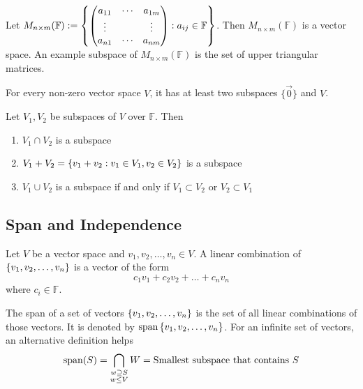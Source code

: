\documentclass[../notes.tex]{subfiles}
\begin{document}
\begin{example}
	Let $M_{n\times m} (\mathbb{F}) := \qty{\mqty(
		a_{11} &\cdots &a_{1m} \\
		\vdots & &\vdots \\
		a_{n1} &\cdots &a_{nm}
	) : a_{ij} \in \mathbb{F}}$. Then $M_{n\times m}(\mathbb{F})$ is a vector space. An example subspace of $M_{n\times m}(\mathbb{F})$ is the set of upper triangular matrices.
\end{example}

\begin{theorem}
	For every non-zero vector space $V$, it has at least two subspaces $\{\vec{0}\}$ and $V$.
\end{theorem}

\begin{theorem}
	Let $V_1, V_2$ be subspaces of $V$ over $\mathbb{F}$. Then
	\begin{enumerate}
		\item $V_1 \cap V_2$ is a subspace
		\item $V_1 + V_2 = \qty{v_1 + v_2 : v_1 \in V_1, v_2 \in V_2}$ is a subspace
		\item $V_1 \cup V_2$ is a subspace if and only if $V_1 \subset V_2$ or $V_2 \subset V_1$
	\end{enumerate}
\end{theorem}

\subsection{Span and Independence}

\begin{definition}
	Let $V$ be a vector space and $v_1, v_2, \ldots, v_{n} \in V$. A linear combination of $\qty{v_1,v_2,\ldots,v_{n}}$ is a vector of the form
	\[
		c_1 v_1 + c_2 v_2 + \ldots + c_{n} v_{n}
	\]
	where $c_i \in \mathbb{F}$.
\end{definition}

\begin{definition}[Span]
	The span of a set of vectors $\qty{v_1, v_2, \ldots, v_n}$ is the set of all linear combinations of those vectors. It is denoted by $\operatorname{span}\qty{v_1, v_2, \ldots, v_n}$. For an infinite set of vectors, an alternative definition helps
	\[
		\operatorname{span}(S) = \bigcap_{\substack{w \supseteq S \\ w \leq V}} W = \text{Smallest subspace that contains } S
	\]
\end{definition}
\end{document}
